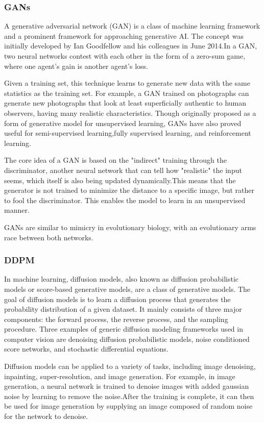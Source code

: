 \documentclass[11pt,a4paper]{report}
\begin{document}
\begin{multicols*}{2}
    \subsubsection{GANs}
    A generative adversarial network (GAN) is a class of machine learning framework and a prominent framework for approaching generative AI. The concept was initially developed by Ian Goodfellow and his colleagues in June 2014.In a GAN, two neural networks contest with each other in the form of a zero-sum game, where one agent's gain is another agent's loss.

    Given a training set, this technique learns to generate new data with the same statistics as the training set. For example, a GAN trained on photographs can generate new photographs that look at least superficially authentic to human observers, having many realistic characteristics. Though originally proposed as a form of generative model for unsupervised learning, GANs have also proved useful for semi-supervised learning,fully supervised learning, and reinforcement learning.

    The core idea of a GAN is based on the "indirect" training through the discriminator, another neural network that can tell how "realistic" the input seems, which itself is also being updated dynamically.This means that the generator is not trained to minimize the distance to a specific image, but rather to fool the discriminator. This enables the model to learn in an unsupervised manner.

    GANs are similar to mimicry in evolutionary biology, with an evolutionary arms race between both networks.
    \subsubsection{DDPM}

    In machine learning, diffusion models, also known as diffusion probabilistic models or score-based generative models, are a class of generative models. The goal of diffusion models is to learn a diffusion process that generates the probability distribution of a given dataset. It mainly consists of three major components: the forward process, the reverse process, and the sampling procedure. Three examples of generic diffusion modeling frameworks used in computer vision are denoising diffusion probabilistic models, noise conditioned score networks, and stochastic differential equations.

    Diffusion models can be applied to a variety of tasks, including image denoising, inpainting, super-resolution, and image generation. For example, in image generation, a neural network is trained to denoise images with added gaussian noise by learning to remove the noise.After the training is complete, it can then be used for image generation by supplying an image composed of random noise for the network to denoise.


\end{multicols*}
\end{document}
